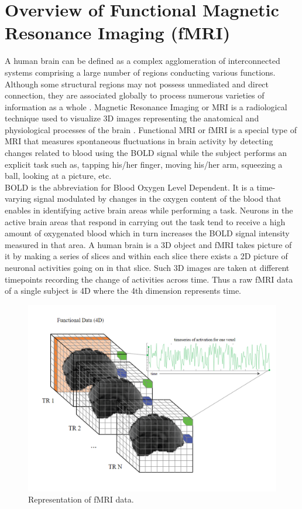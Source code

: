 \section{Overview of Functional Magnetic Resonance Imaging (fMRI)}
A human brain can be defined as a complex agglomeration of interconnected systems
comprising a large number of regions conducting various functions. Although some structural
regions may not possess unmediated and direct connection, they are associated globally to
process numerous varieties of information as a whole \cite{guo2017diagnosing}. Magnetic Resonance Imaging or
MRI is a radiological technique used to visualize 3D images representing the anatomical and
physiological processes of the brain \cite{wikipedia_2021}. Functional MRI or fMRI is a special type of MRI that
measures spontaneous fluctuations in brain activity by detecting changes related to blood
using the BOLD signal while the subject performs an explicit task such as, tapping his/her
finger, moving his/her arm, squeezing a ball, looking at a picture, etc.\\

BOLD is the abbreviation for Blood Oxygen Level Dependent. It is a time-varying signal
modulated by changes in the oxygen content of the blood that enables in identifying active
brain areas while performing a task. Neurons in the active brain areas that respond in carrying
out the task tend to receive a high amount of oxygenated blood which in turn increases the
BOLD signal intensity measured in that area. A human brain is a 3D object and fMRI takes
picture of it by making a series of slices and within each slice there exists a 2D picture of
neuronal activities going on in that slice. Such 3D images are taken at different timepoints
recording the change of activities across time. Thus a raw fMRI data of a single subject is 4D
where the 4th dimension represents time.\\

\begin{figure}[h]
\centering
\includegraphics[width=\textwidth]{figures/2.1 overview of fMRI.png}
\caption{Representation of fMRI data.}
\label{fig: 2.1}
\end{figure}

